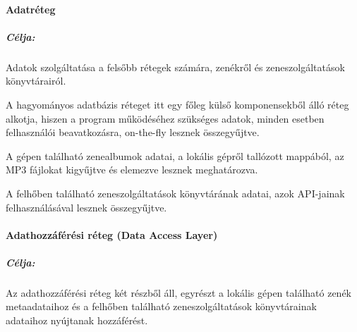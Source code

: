 \paragraph{Adatréteg}
\label{par:adatreteg}

\subparagraph{Célja:}

Adatok szolgáltatása a felsőbb rétegek számára, zenékről és zeneszolgáltatások könyvtárairól.

A hagyományos adatbázis réteget itt egy főleg külső komponensekből álló réteg alkotja, hiszen a program működéséhez szükséges adatok, minden esetben felhasználói beavatkozásra, on-the-fly lesznek összegyűjtve.

A gépen található zenealbumok adatai, a lokális gépről tallózott mappából, az MP3 fájlokat kigyűjtve és elemezve lesznek meghatározva.

A felhőben található zeneszolgáltatások könyvtárának adatai, azok API-jainak felhasználásával lesznek összegyűjtve.


\paragraph{Adathozzáférési réteg (Data Access Layer)}
\label{par:dal}

\subparagraph{Célja:}

Az adathozzáférési réteg két részből áll, egyrészt a lokális gépen található zenék metaadataihoz és a felhőben található zeneszolgáltatások könyvtárainak adataihoz nyújtanak hozzáférést.

